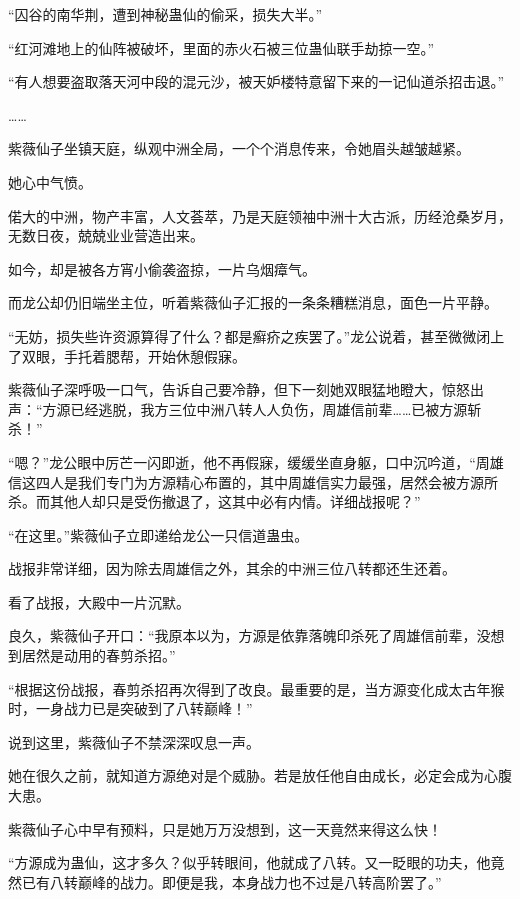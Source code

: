 
\begin{this_body}



“囚谷的南华荆，遭到神秘蛊仙的偷采，损失大半。”

“红河滩地上的仙阵被破坏，里面的赤火石被三位蛊仙联手劫掠一空。”

“有人想要盗取落天河中段的混元沙，被天妒楼特意留下来的一记仙道杀招击退。”

……

紫薇仙子坐镇天庭，纵观中洲全局，一个个消息传来，令她眉头越皱越紧。

她心中气愤。

偌大的中洲，物产丰富，人文荟萃，乃是天庭领袖中洲十大古派，历经沧桑岁月，无数日夜，兢兢业业营造出来。

如今，却是被各方宵小偷袭盗掠，一片乌烟瘴气。

而龙公却仍旧端坐主位，听着紫薇仙子汇报的一条条糟糕消息，面色一片平静。

“无妨，损失些许资源算得了什么？都是癣疥之疾罢了。”龙公说着，甚至微微闭上了双眼，手托着腮帮，开始休憩假寐。

紫薇仙子深呼吸一口气，告诉自己要冷静，但下一刻她双眼猛地瞪大，惊怒出声：“方源已经逃脱，我方三位中洲八转人人负伤，周雄信前辈……已被方源斩杀！”

“嗯？”龙公眼中厉芒一闪即逝，他不再假寐，缓缓坐直身躯，口中沉吟道，“周雄信这四人是我们专门为方源精心布置的，其中周雄信实力最强，居然会被方源所杀。而其他人却只是受伤撤退了，这其中必有内情。详细战报呢？”

“在这里。”紫薇仙子立即递给龙公一只信道蛊虫。

战报非常详细，因为除去周雄信之外，其余的中洲三位八转都还生还着。

看了战报，大殿中一片沉默。

良久，紫薇仙子开口：“我原本以为，方源是依靠落魄印杀死了周雄信前辈，没想到居然是动用的春剪杀招。”

“根据这份战报，春剪杀招再次得到了改良。最重要的是，当方源变化成太古年猴时，一身战力已是突破到了八转巅峰！”

说到这里，紫薇仙子不禁深深叹息一声。

她在很久之前，就知道方源绝对是个威胁。若是放任他自由成长，必定会成为心腹大患。

紫薇仙子心中早有预料，只是她万万没想到，这一天竟然来得这么快！

“方源成为蛊仙，这才多久？似乎转眼间，他就成了八转。又一眨眼的功夫，他竟然已有八转巅峰的战力。即便是我，本身战力也不过是八转高阶罢了。”


\end{this_body}

